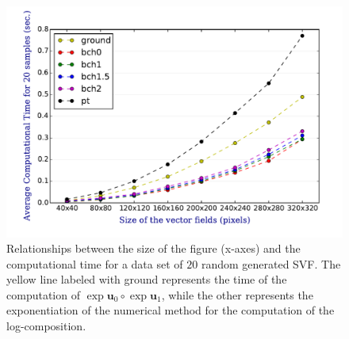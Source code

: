 \begin{figure}[!ht]
	\includegraphics[scale=0.7]{figures/svf_computational_time.pdf}
	\caption{Relationships between the size of the figure (x-axes) and the computational time for a data set of $20$ random generated SVF. The yellow line labeled with ground represents the time of the computation of $\exp{\mathbf{u}_0}\circ \exp{\mathbf{u}_1}$, while the other represents the exponentiation of the numerical method for the computation of the log-composition.}
	\label{fig:svf_computational_time}
\end{figure}






